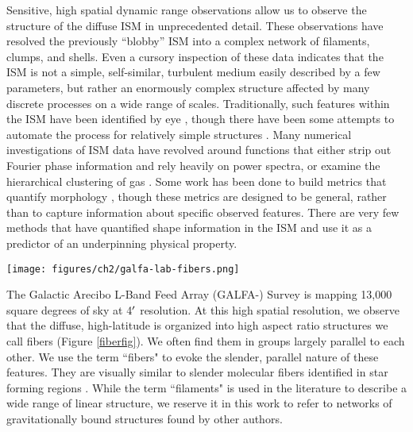 Sensitive, high spatial dynamic range \hi observations allow us to observe the structure of the diffuse ISM in unprecedented detail. These observations have resolved the previously ``blobby'' ISM into a complex network of filaments, clumps, and shells. Even a cursory inspection of these data indicates that the ISM is not a simple, self-similar, turbulent medium easily described by a few parameters, but rather an enormously complex structure affected by many discrete processes on a wide range of scales.
Traditionally, such features within the ISM have been identified by eye \citep[e.g.,][]{2006ASPC..352...95M, Begum:2010bj}, though there have been some attempts to automate the process for relatively simple structures \citep[e.g.,][]{Saul:2012gt}.  Many numerical investigations of ISM data have revolved around functions that either strip out Fourier phase information and rely heavily on power spectra, or examine the hierarchical clustering of gas \citep[e.g.,][]{Burkhart:2011ui}. Some work has been done to build metrics that quantify morphology \citep{Adams:1992kh,2004ApJ...601..352K,Robitaille:2010ii}, though these metrics are designed to be general, rather than to capture information about specific observed features.  There are very few methods that have quantified shape information in the ISM and use it as a predictor of an underpinning physical property.

\begin{figure*}
\centering
\texttt{[image: figures/ch2/galfa-lab-fibers.png]}
\caption{\hi data at high Galactic latitude. Top panel is taken from the 36$^\prime$ resolution Leiden-Argentina-Bonn survey \citep[LAB]{Kalberla:2005de}, bottom panel from a section of the 4$^\prime$ resolution GALFA-\hi DR1 data analyzed in this work. Red, blue, and green channels represent -7 to -4 \kms, -3 to -1 \kms, and 0 to 3 \kms, respectively. Brightnesses are shown in a logarithmic stretch in brightness temperature from 0.5 K (dark) to 5 K (light), or an \hi column density range of $3 \times 10^{18}$ cm$^{-2}$ to $3 \times 10^{19}$ cm$^{-2}$. The slender fiber features can be seen in the bottom panel but are washed out by low resolution of the LAB survey in the top panel.}
\label{fiberfig}
\end{figure*}

The Galactic Arecibo L-Band Feed Array \hi (GALFA-\hia) Survey  is mapping 13,000 square degrees of sky at 4${\mbox{$^\prime$}}$ resolution. At this high spatial resolution, we observe that the diffuse, high-latitude \hi is organized into high aspect ratio structures we call fibers (Figure \ref{fiberfig}). We often find them in groups largely parallel to each other. We use the term ``fibers" to evoke the slender, parallel nature of these \hi features. They are visually similar to slender molecular fibers identified in star forming regions \citep[e.g.,][]{2014prpl.conf...27A,Hacar:2013uh}. While the term ``filaments" is used in the literature to describe a wide range of linear structure, we reserve it in this work to refer to networks of gravitationally bound structures found by other authors. 

